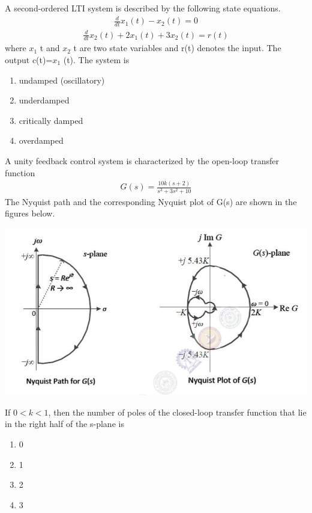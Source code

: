 \item A second-ordered LTI system is described by the following state equations.
\begin{align}
\frac{d}{dt} x_1 (t) - x_2 (t) = 0
\end{align}
\begin{align}
\frac{d}{dt} x_2 (t) + 2 x_1 (t) + 3 x_2 (t) = r(t)
\end{align}
where $x_{1}$ t and $x_{2}$ t are two state variables and r(t) denotes the input. The output c(t)=$x_{1}$ (t). The system is
\begin{enumerate}
\item undamped (oscillatory)
\item underdamped
\item critically damped
\item overdamped
\end{enumerate}

\item A unity feedback control system is characterized by the open-loop transfer function
\begin{align*}
G(s) = \frac{10k(s + 2)}{s^3 + 3s^2 +10}
\end{align*}
The Nyquist path and the corresponding Nyquist plot of G(s) are shown in the figures below.

\includegraphics[scale=0.3]{48}

If $0 < k < 1$, then the number of poles of the closed-loop transfer function that lie in the right half of the s-plane is 
\begin{enumerate}
\item 0
\item 1
\item 2 
\item 3
\end{enumerate}

